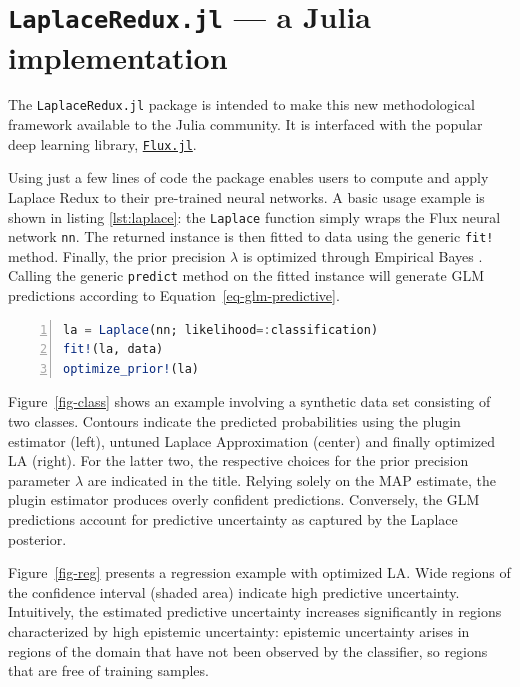 \documentclass{juliacon}
\begin{document}
\hypertarget{laplaceredux.jl-a-julia-implementation}{%
\section{\texorpdfstring{\texttt{LaplaceRedux.jl} --- a Julia
implementation}{LaplaceRedux.jl --- a Julia implementation}}\label{laplaceredux.jl-a-julia-implementation}}

The \texttt{LaplaceRedux.jl} package is intended to make this new
methodological framework available to the Julia community. It is
interfaced with the popular deep learning library,
\href{https://fluxml.ai/}{\texttt{Flux.jl}}.

Using just a few lines of code the package enables users to compute and
apply Laplace Redux to their pre-trained neural networks. A basic usage
example is shown in listing \ref{lst:laplace}: the \texttt{Laplace}
function simply wraps the Flux neural network \texttt{nn}. The returned
instance is then fitted to data using the generic \texttt{fit!} method.
Finally, the prior precision \(\lambda\) is optimized through Empirical
Bayes \autocite{daxberger2021laplace}. Calling the generic
\texttt{predict} method on the fitted instance will generate GLM
predictions according to Equation~\ref{eq-glm-predictive}.

\begin{lstlisting}[language=Julia, escapechar=@, numbers=left, label={lst:laplace}, caption={}]
la = Laplace(nn; likelihood=:classification)
fit!(la, data)
optimize_prior!(la)
\end{lstlisting}

Figure~\ref{fig-class} shows an example involving a synthetic data set
consisting of two classes. Contours indicate the predicted probabilities
using the plugin estimator (left), untuned Laplace Approximation
(center) and finally optimized LA (right). For the latter two, the
respective choices for the prior precision parameter \(\lambda\) are
indicated in the title. Relying solely on the MAP estimate, the plugin
estimator produces overly confident predictions. Conversely, the GLM
predictions account for predictive uncertainty as captured by the
Laplace posterior.

Figure~\ref{fig-reg} presents a regression example with optimized LA.
Wide regions of the confidence interval (shaded area) indicate high
predictive uncertainty. Intuitively, the estimated predictive
uncertainty increases significantly in regions characterized by high
epistemic uncertainty: epistemic uncertainty arises in regions of the
domain that have not been observed by the classifier, so regions that
are free of training samples.
\end{document}
